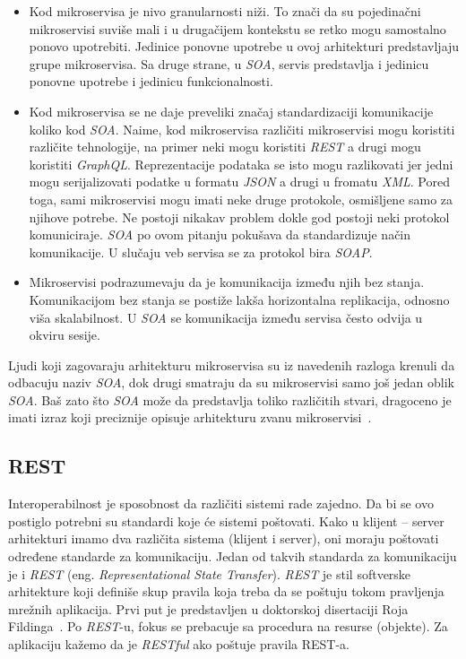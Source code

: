 \begin{itemize}
    \item Kod mikroservisa je nivo granularnosti niži. To znači da su pojedinačni mikroservisi suviše mali i u drugačijem 
    kontekstu se retko mogu samostalno ponovo upotrebiti. Jedinice ponovne upotrebe u ovoj arhitekturi predstavljaju grupe mikroservisa.
    Sa druge strane, u \textit{SOA}, servis predstavlja i jedinicu ponovne upotrebe i jedinicu funkcionalnosti.
    \item Kod mikroservisa se ne daje preveliki značaj standardizaciji komunikacije koliko kod \textit{SOA}. Naime, kod mikroservisa
    različiti mikroservisi mogu koristiti različite tehnologije, na primer neki mogu koristiti \textit{REST} a drugi mogu koristiti \textit{GraphQL}.
    Reprezentacije podataka se isto mogu razlikovati jer jedni mogu serijalizovati podatke u formatu \textit{JSON} a drugi u fromatu \textit{XML}.
    Pored toga, sami mikroservisi mogu imati neke druge protokole, osmišljene samo za njihove potrebe. 
    Ne postoji nikakav problem dokle god postoji neki protokol komuniciraje. %
    \textit{SOA} po ovom pitanju pokušava da standardizuje način komunikacije. U slučaju veb servisa se za protokol bira \textit{SOAP}.
    \item Mikroservisi podrazumevaju da je komunikacija između njih bez stanja. Komunikacijom bez stanja se postiže lakša horizontalna replikacija, odnosno 
    viša skalabilnost. U \textit{SOA} se komunikacija između servisa često odvija u okviru sesije.
\end{itemize}		

Ljudi koji zagovaraju arhitekturu mikroservisa su iz navedenih razloga krenuli da odbacuju naziv \textit{SOA}, 
dok drugi smatraju da su mikroservisi samo još jedan oblik \textit{SOA}. Baš zato što \textit{SOA} 
može da predstavlja toliko različitih stvari, dragoceno je imati izraz koji preciznije opisuje arhitekturu 
zvanu mikroservisi~\cite{martinfowler_microservices}.

\subsection{REST}\label{sec:arhitektura-rest}

Interoperabilnost je sposobnost da različiti sistemi rade zajedno. Da bi se ovo postiglo potrebni su 
standardi koje će sistemi poštovati. Kako u klijent -- server arhitekturi imamo dva različita sistema 
(klijent i server), oni moraju poštovati određene standarde za komunikaciju. Jedan od takvih standarda za 
komunikaciju je i \textit{REST} (eng. \textit{Representational State Transfer}). \textit{REST} je stil 
softverske arhitekture koji definiše skup pravila koja treba da se poštuju tokom pravljenja mrežnih 
aplikacija. Prvi put je predstavljen u doktorskoj disertaciji Roja Fildinga~\cite{REST_Roy}. Po \textit{REST}-u, 
fokus se prebacuje sa procedura na resurse (objekte). Za aplikaciju kažemo da je \textit{RESTful} ako poštuje pravila REST-a.


